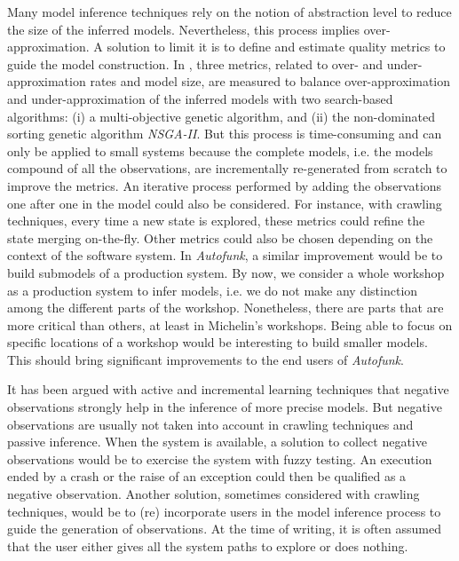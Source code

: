 Many model inference techniques rely on the notion of abstraction
level to reduce the size of the inferred models. Nevertheless,
this process implies over-approximation. A solution to limit it
is to define and estimate quality metrics
\cite{tonella2012finding,Lo20122063} to guide the model
construction. In \cite{tonella2012finding}, three metrics,
related to over- and under-approximation rates and model size,
are measured to balance over-approximation and
under-approximation of the inferred models with two search-based
algorithms: (i) a multi-objective genetic algorithm, and (ii) the
non-dominated sorting genetic algorithm \textit{NSGA-II}. But
this process is time-consuming and can only be applied to small
systems because the complete models, i.e. the models compound of
all the observations, are incrementally re-generated from scratch
to improve the metrics.  An iterative process performed by adding
the observations one after one in the model could also be
considered. For instance, with crawling techniques, every time a
new state is explored, these metrics could refine the state
merging on-the-fly. Other metrics could also be chosen depending
on the context of the software system. In \textit{Autofunk}, a
similar improvement would be to build submodels of a production
system. By now, we consider a whole workshop as a production
system to infer models, i.e. we do not make any distinction among
the different parts of the workshop. Nonetheless, there are parts
that are more critical than others, at least in Michelin's
workshops. Being able to focus on specific locations of a
workshop would be interesting to build smaller models. This
should bring significant improvements to the end users of
\textit{Autofunk}.

It has been argued with active and incremental learning
techniques that negative observations strongly help in the
inference of more precise models. But negative observations are
usually not taken into account in crawling techniques and passive
inference. When the system is available, a solution to collect
negative observations would be to exercise the system with fuzzy
testing. An execution ended by a crash or the raise of an
exception could then be qualified as a negative observation.
Another solution, sometimes considered with crawling techniques,
would be to (re) incorporate users in the model inference process
to guide the generation of observations. At the time of writing,
it is often assumed that the user either gives all the system
paths to explore or does nothing.

